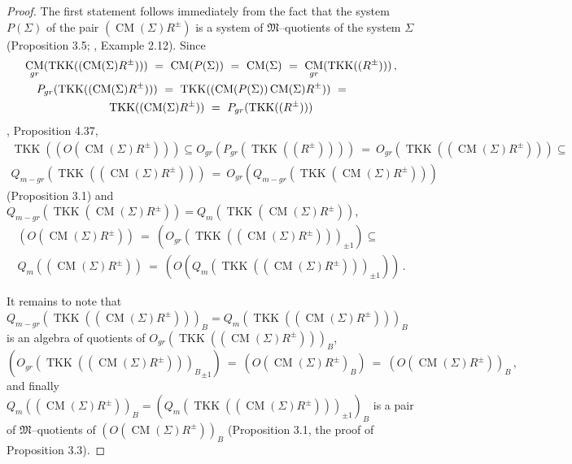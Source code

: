 \documentclass[a4paper,11pt]{article}
\DeclareMathOperator{\CM}{CM}
\DeclareMathOperator{\TKK}{TKK}
\begin{document}
\begin{proof}
The first statement follows immediately from the fact that the system 
$P(\Sigma)$ of the pair $(\CM(\Sigma) R^{\pm})$ is a system of 
$\mathfrak{M}$--quotients of the system $\Sigma$ (Proposition 3.5; 
\cite{JMQ}, Example 2.12). Since 
\begin{multline*}
\CM_{gr}(\TKK((\CM(\Sigma) R^{\pm})))\ =\ \CM(P(\Sigma))\ =\ 
\CM(\Sigma)\ =\ \CM_{gr}(\TKK((R^{\pm})))\,,
\\
\shoveleft{
P_{gr}(\TKK((\CM(\Sigma) R^{\pm})))\ =\ 
\TKK((\CM(P(\Sigma)) \CM(\Sigma) R^{\pm}))\ =}
\\ 
\TKK((\CM(\Sigma) R^{\pm}))\ =\ P_{gr}(\TKK((R^{\pm})))
\end{multline*}
\cite{Gol6}, Proposition 4.37, 
\begin{multline*}
\TKK((O(\CM(\Sigma) R^{\pm})))\subseteq
O_{gr}(P_{gr}(\TKK((R^{\pm}))))\ =\ O_{gr}(\TKK((\CM(\Sigma) R^{\pm})))
\subseteq 
\\
Q_{m-gr}(\TKK((\CM(\Sigma) R^{\pm})))\ =\ 
O_{gr}(Q_{m-gr}(\TKK(\CM(\Sigma) R^{\pm})))
\end{multline*}
(Proposition 3.1) and 
${Q_{m-gr}(\TKK(\CM(\Sigma) R^{\pm}))=Q_m(\TKK(\CM(\Sigma) R^{\pm}))}$,
\begin{multline*}
(O(\CM(\Sigma) R^{\pm}))\ =\ (O_{gr}(\TKK((\CM(\Sigma) R^{\pm})))_{\pm 1})
\subseteq
\\ 
Q_m((\CM(\Sigma) R^{\pm}))\ =\ 
(O(Q_m(\TKK((\CM(\Sigma) R^{\pm})))_{\pm 1}))\,.
\end{multline*}

It remains to note that  
${Q_{m-gr}(\TKK((\CM(\Sigma) R^{\pm})))_B=
Q_m(\TKK((\CM(\Sigma) R^{\pm})))_B}$ is an algebra of 
quotients of ${O_{gr}(\TKK((\CM(\Sigma) R^{\pm})))_B}$, 
\[
({O_{gr}(\TKK((\CM(\Sigma) R^{\pm})))_B}_{\pm 1})\ =\ 
(O(\CM(\Sigma) R^{\pm})_B)\ =\ (O(\CM(\Sigma) R^{\pm}))_B\,,
\]
and finally 
${Q_m((\CM(\Sigma) R^{\pm}))_B=(Q_m(\TKK((\CM(\Sigma) R^{\pm})))_{\pm 1})_B}$ 
is a pair of $\mathfrak{M}$--quotients of $(O(\CM(\Sigma) R^{\pm}))_B$ 
(Proposition 3.1, the proof of Proposition 3.3).
\end{proof}
\end{document}
